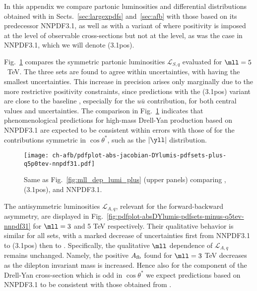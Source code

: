 
In this appendix we compare partonic luminosities
and \lhc differential distributions obtained with  in
Sects.~\ref{sec:largexpdfs}
and~\ref{sec:afb} with those based 
on its predecessor
NNPDF3.1, as well as with a variant of 
where positivity is imposed at the level of observable cross-sections but
not at the \pdf level, as was the case in  NNPDF3.1, which we will denote
(3.1pos).

Fig.~\ref{fig:pdfplot-absDYlumis-pdfsets-plus-q5tev-nnpdf31}
compares the 
symmetric partonic luminosities $\mathcal{L}_{S,q}$
evaluated for $\mll=5$~TeV.
%
The three sets are found to agree within uncertainties,
with  having the smallest uncertainties.
%
This increase in precision
arises only marginally due to the more restrictive positivity constraints,
since predictions with the (3.1pos) variant 
are close to the baseline , especially 
for the $u\bar{u}$ contribution, for both central values and uncertainties.
%
The comparison in Fig.~\ref{fig:pdfplot-absDYlumis-pdfsets-plus-q5tev-nnpdf31}
indicates that phenomenological predictions for high-mass Drell-Yan
production based on NNPDF3.1 are expected
to be consistent within errors with those of  for the contributions
symmetric in $\cos\theta^*$, such as the $|\yll|$ distribution.

\begin{figure}[!t]
 \centering
 \texttt{[image: ch-afb/pdfplot-abs-jacobian-DYlumis-pdfsets-plus-q5p0tev-nnpdf31.pdf]}
 \caption{Same as Fig.~\ref{fig:mll_dep_lumi_plus} (upper panels) comparing
, (3.1pos), and NNPDF3.1.
 }    
 \label{fig:pdfplot-absDYlumis-pdfsets-plus-q5tev-nnpdf31}
\end{figure}

The antisymmetric luminosities $\mathcal{L}_{A,q}$, relevant for the
forward-backward asymmetry, are displayed in Fig.~\ref{fig:pdfplot-absDYlumis-pdfsets-minus-q5tev-nnpdf31}
for $\mll = 3$ and 5 TeV respectively.
%
Their qualitative behavior is similar for all  \pdf sets,
with a marked decrease of \pdf uncertainties first from NNPDF3.1
to  (3.1pos)  then
to .
%
Specifically, the qualitative $\mll$ dependence
of $\mathcal{L}_{A,q}$ remains unchanged. Namely, the positive $A_{\rm fb}$
found for $\mll= 3$ TeV decreases 
as the dilepton invariant mass is increased.
%
Hence also for the component of the Drell-Yan cross-section which is odd
in $\cos\theta^*$ we expect \lhc predictions based on NNPDF3.1 to be consistent
with those obtained from .

